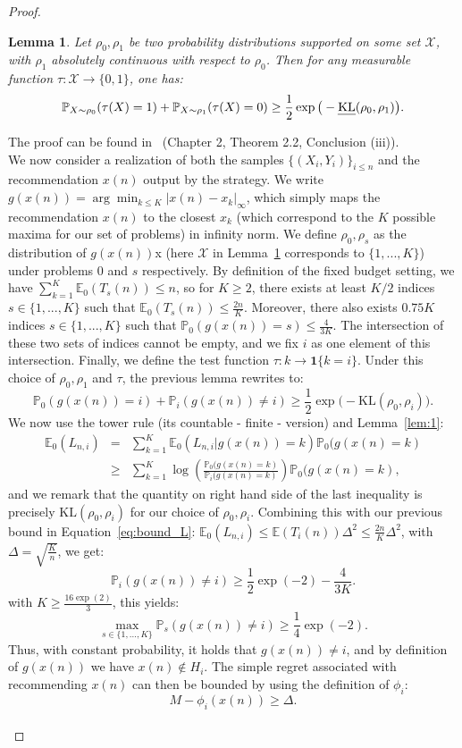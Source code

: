 \documentclass[final,12pt]{colt2018}
\newtheorem{lem}{Lemma}
\begin{document}
\begin{proof}
\begin{lem}\label{lem:2}
Let $\rho_0, \rho_1$ be two probability distributions supported on some set $\mathcal X$, with $\rho_1$ absolutely continuous with respect to $\rho_0$. Then for any measurable function $\tau : \mathcal X \rightarrow \{0, 1\}$, one has:
$$
\mathbb P_{X \sim \rho_0}(\tau(X) = 1) + \mathbb P_{X \sim \rho_1}(\tau(X) = 0) \geq \frac{1}{2} \exp\big(-\text{\emph{KL}}(\rho_0, \rho_1)\big).
$$
\end{lem}
The proof can be found in~\cite{tsybakovintroduction} (Chapter 2, Theorem 2.2, Conclusion (iii)).\\

We now consider a realization of both the samples $\{(X_i,Y_i)\}_{i\leq n}$ and the recommendation $x(n)$ output by the strategy. We write $g(x(n)) = \arg\min_{k \leq K} |x(n) - x_k|_{\infty}$, which simply maps the recommendation $x(n)$ to the closest $x_k$ (which correspond to the $K$ possible maxima for our set of problems) in infinity norm. We define $\rho_0, \rho_s$ as the distribution of $g(x(n))$x (here $\mathcal X$ in Lemma~\ref{lem:2} corresponds to $\{1,...,K\}$) under problems $0$ and $s$ respectively. By definition of the fixed budget setting, we have ${\sum_{k=1}^K \mathbb E_0(T_s(n)) \leq n}$, so for $K \geq 2$, there exists at least $K/2$ indices $s \in \{1,...,K\}$ such that $\mathbb E_0(T_s(n)) \leq \frac{2n}{K}$. Moreover, there also exists $0.75K$ indices $s \in \{1,...,K\}$ such that $\mathbb P_0(g(x(n)) = s) \leq \frac{4}{3K}$. The intersection of these two sets of indices cannot be empty, and we fix $i$ as one element of this intersection. Finally, we define the test function $\tau: k \rightarrow \mathbf 1\{k = i\}$. Under this choice of $\rho_0, \rho_1$ and $\tau$, the previous lemma rewrites to:
$$
\mathbb P_{0}(g(x(n)) = i) + \mathbb P_{i}(g(x(n)) \neq i) \geq \frac{1}{2} \exp\big(-\text{KL}(\rho_0, \rho_i)\big).
$$
We now use the tower rule (its countable - finite - version) and Lemma~\ref{lem:1}:
\begin{eqnarray*}
\mathbb E_0(L_{n,i}) & = & \sum_{k = 1}^K \mathbb E_0(L_{n,i} | g(x(n)) = k) \mathbb P_0(g(x(n) = k) \\ \nonumber
& \geq & \sum_{k = 1}^K \log \left(\frac{\mathbb P_0(g(x(n) = k)}{\mathbb P_i(g(x(n) = k)}\right) \mathbb P_0(g(x(n) = k),
\end{eqnarray*}
and we remark that the quantity on right hand side of the last inequality is precisely $\text{KL}(\rho_0, \rho_i)$ for our choice of $\rho_0, \rho_i$. Combining this with our previous bound in Equation~\eqref{eq:bound_L}: ${\mathbb E_0(L_{n,i}) \leq \mathbb E(T_i(n))\Delta^2 \leq \frac{2n}{K}\Delta^2}$, with $\Delta = \sqrt{\frac{K}{n}}$, we get:
$$
\mathbb P_{i}(g(x(n)) \neq i) \geq \frac{1}{2}\exp(-2) - \frac{4}{3K}.
$$
with $K  \geq \frac{16\exp(2)}{3}$, this yields:
$$
\max_{s \in \{1, ..., K\}} \mathbb P_{s}(g(x(n)) \neq i) \geq \frac{1}{4}\exp(-2).
$$
Thus, with constant probability, it holds that $g(x(n)) \neq i$, and by definition of $g(x(n))$ we have $x(n) \not \in H_i$. The simple regret associated with recommending $x(n)$ can then be bounded by using the definition of $\phi_i$:
$$M - \phi_i(x(n)) \geq \Delta.$$\\


\end{proof}
\end{document}
